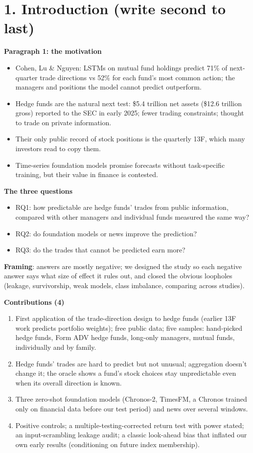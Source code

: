 \documentclass[11pt]{article}
\begin{document}
\section*{1. Introduction (write second to last)}
\textbf{Paragraph 1: the motivation}
\begin{itemize}
  \item Cohen, Lu \& Nguyen: LSTMs on mutual fund holdings predict 71\% of
  next-quarter trade directions vs 52\% for each fund's most common action;
  the managers and positions the model cannot predict outperform.
  \item Hedge funds are the natural next test: \$5.4 trillion net assets
  (\$12.6 trillion gross) reported to the SEC in early 2025; fewer trading
  constraints; thought to trade on private information.
  \item Their only public record of stock positions is the quarterly 13F, which
  many investors read to copy them.
  \item Time-series foundation models promise forecasts without task-specific
  training, but their value in finance is contested.
\end{itemize}
\textbf{The three questions}
\begin{itemize}
  \item RQ1: how predictable are hedge funds' trades from public information,
  compared with other managers and individual funds measured the same way?
  \item RQ2: do foundation models or news improve the prediction?
  \item RQ3: do the trades that cannot be predicted earn more?
\end{itemize}
\textbf{Framing}: answers are mostly negative; we designed the study so each
negative answer says what size of effect it rules out, and closed the obvious
loopholes (leakage, survivorship, weak models, class imbalance, comparing
across studies).

\noindent\textbf{Contributions (4)}
\begin{enumerate}
  \item First application of the trade-direction design to hedge funds (earlier
  13F work predicts portfolio weights); free public data; five samples:
  \fundsallM{} hand-picked hedge funds, \fundsallA{} Form ADV hedge funds,
  \fundsallL{} long-only managers, \fundsallN{} mutual funds, individually and
  by family.
  \item Hedge funds' trades are hard to predict but not unusual; aggregation
  doesn't change it; the oracle shows a fund's stock choices stay unpredictable
  even when its overall direction is known.
  \item Three zero-shot foundation models (Chronos-2, TimesFM, a Chronos trained
  only on financial data before our test period) and news over several windows.
  \item Positive controls; a multiple-testing-corrected return test with power
  stated; an input-scrambling leakage audit; a classic look-ahead bias that
  inflated our own early results (conditioning on future index membership).
\end{enumerate}
\end{document}
